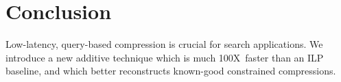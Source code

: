 \documentclass[11pt,a4paper]{article}
\newcommand{\speedup}[0]{100X~}
\begin{document}
\section{Conclusion}

Low-latency, query-based compression is crucial for search applications. We introduce a new additive technique which is much \speedup faster than an ILP baseline, and which better reconstructs known-good constrained compressions. 



%



\end{document}
